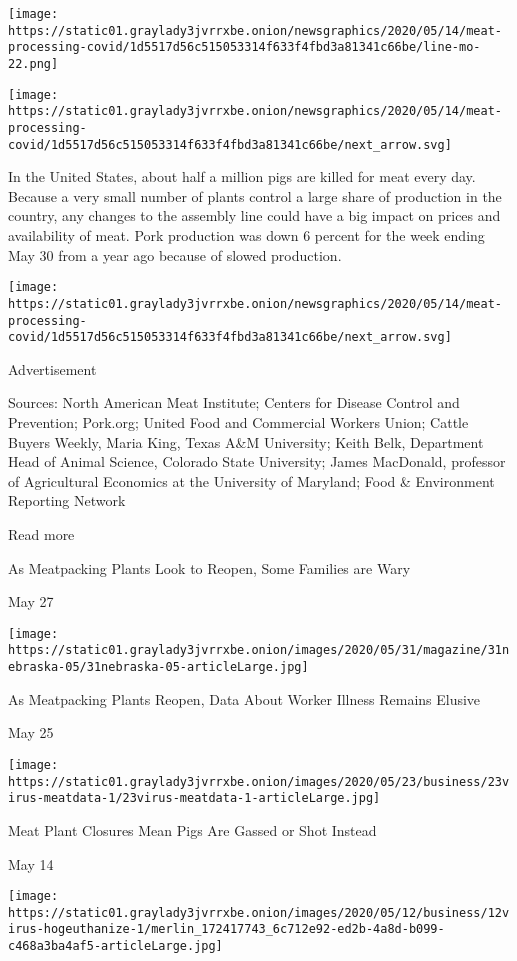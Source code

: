 \texttt{[image: https://static01.graylady3jvrrxbe.onion/newsgraphics/2020/05/14/meat-processing-covid/1d5517d56c515053314f633f4fbd3a81341c66be/line-mo-22.png]}

\texttt{[image: https://static01.graylady3jvrrxbe.onion/newsgraphics/2020/05/14/meat-processing-covid/1d5517d56c515053314f633f4fbd3a81341c66be/next\_arrow.svg]}

In the United States, about half a million pigs are killed for meat
every day. Because a very small number of plants control a large share
of production in the country, any changes to the assembly line could
have a big impact on prices and availability of meat. Pork production
was down 6 percent for the week ending May 30 from a year ago because of
slowed production.

\texttt{[image: https://static01.graylady3jvrrxbe.onion/newsgraphics/2020/05/14/meat-processing-covid/1d5517d56c515053314f633f4fbd3a81341c66be/next\_arrow.svg]}

Advertisement

Sources: North American Meat Institute; Centers for Disease Control and
Prevention; Pork.org; United Food and Commercial Workers Union; Cattle
Buyers Weekly, Maria King, Texas A\&M University; Keith Belk, Department
Head of Animal Science, Colorado State University; James MacDonald,
professor of Agricultural Economics at the University of Maryland; Food
\& Environment Reporting Network

Read more

\href{https://www.nytimes3xbfgragh.onion/interactive/2020/05/27/magazine/coronavirus-nebraska-unemployment-jobs.html}{}

As Meatpacking Plants Look to Reopen, Some Families are Wary

May 27

\texttt{[image: https://static01.graylady3jvrrxbe.onion/images/2020/05/31/magazine/31nebraska-05/31nebraska-05-articleLarge.jpg]}

\href{https://www.nytimes3xbfgragh.onion/2020/05/25/business/coronavirus-meatpacking-plants-cases.html}{}

As Meatpacking Plants Reopen, Data About Worker Illness Remains Elusive

May 25

\texttt{[image: https://static01.graylady3jvrrxbe.onion/images/2020/05/23/business/23virus-meatdata-1/23virus-meatdata-1-articleLarge.jpg]}

\href{https://www.nytimes3xbfgragh.onion/2020/05/14/business/coronavirus-farmers-killing-pigs.html}{}

Meat Plant Closures Mean Pigs Are Gassed or Shot Instead

May 14

\texttt{[image: https://static01.graylady3jvrrxbe.onion/images/2020/05/12/business/12virus-hogeuthanize-1/merlin\_172417743\_6c712e92-ed2b-4a8d-b099-c468a3ba4af5-articleLarge.jpg]}
